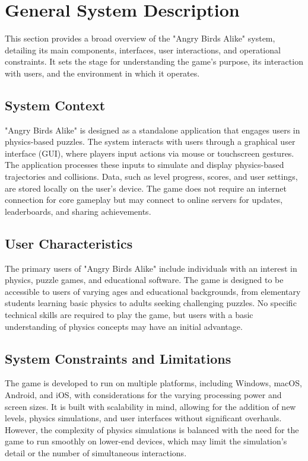 \documentclass[12pt]{article}
\begin{document}
\section{General System Description}

This section provides a broad overview of the "Angry Birds Alike" system, detailing its main components, interfaces, user interactions, and operational constraints. It sets the stage for understanding the game's purpose, its interaction with users, and the environment in which it operates.

\subsection{System Context}

"Angry Birds Alike" is designed as a standalone application that engages users in physics-based puzzles. The system interacts with users through a graphical user interface (GUI), where players input actions via mouse or touchscreen gestures. The application processes these inputs to simulate and display physics-based trajectories and collisions. Data, such as level progress, scores, and user settings, are stored locally on the user's device. The game does not require an internet connection for core gameplay but may connect to online servers for updates, leaderboards, and sharing achievements.

\subsection{User Characteristics}

The primary users of "Angry Birds Alike" include individuals with an interest in physics, puzzle games, and educational software. The game is designed to be accessible to users of varying ages and educational backgrounds, from elementary students learning basic physics to adults seeking challenging puzzles. No specific technical skills are required to play the game, but users with a basic understanding of physics concepts may have an initial advantage.

\subsection{System Constraints and Limitations}

The game is developed to run on multiple platforms, including Windows, macOS, Android, and iOS, with considerations for the varying processing power and screen sizes. It is built with scalability in mind, allowing for the addition of new levels, physics simulations, and user interfaces without significant overhauls. However, the complexity of physics simulations is balanced with the need for the game to run smoothly on lower-end devices, which may limit the simulation's detail or the number of simultaneous interactions.
\end{document}
